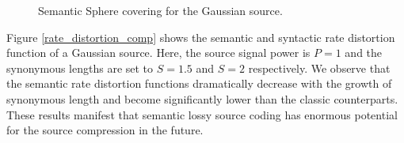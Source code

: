 \documentclass[12pt, draftclsnofoot,onecolumn]{IEEEtran}
\begin{document}
\begin{figure}[htbp]
\setlength{\abovecaptionskip}{0.cm}
\setlength{\belowcaptionskip}{-0.cm}
  \caption{Semantic Sphere covering for the Gaussian source.}\label{Semantic_Sphere_covering}
\end{figure}

Figure \ref{rate_distortion_comp} shows the semantic and syntactic rate distortion function of a Gaussian source. Here, the source signal power is $P=1$ and the synonymous lengths are set to $S=1.5$ and $S=2$ respectively. We observe that the semantic rate distortion functions dramatically decrease with the growth of synonymous length and become significantly lower than the classic counterparts. These results manifest that semantic lossy source coding has enormous potential for the source compression in the future.
\end{document}
